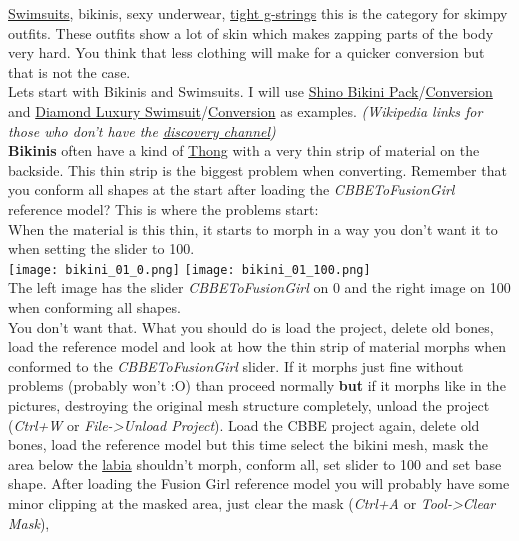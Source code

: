 \href{https://www.youtube.com/watch?v=-JuFE8AffBc&t=5s}{Swimsuits}, bikinis, sexy underwear, \href{https://www.youtube.com/watch?v=2aXTR27guQg&t=2m12s}{tight g-strings}
this is the category for skimpy outfits. These outfits show a lot of skin which makes zapping parts of the body very hard. You think 
that less clothing will make for a quicker conversion but that is not the case.\\
Lets start with Bikinis and Swimsuits. I will use 
\href{https://www.nexusmods.com/fallout4/mods/31788}{Shino Bikini Pack}/\href{https://www.nexusmods.com/fallout4/mods/39914}{Conversion} and
\href{https://www.nexusmods.com/fallout4/mods/24329}{Diamond Luxury Swimsuit}/\href{https://www.nexusmods.com/fallout4/mods/39754}{Conversion}
as examples. \textit{(Wikipedia links for those who don't have the \href{https://www.youtube.com/watch?v=l7KEuKKuuas&t=1m1s}{discovery channel})}\\
\textbf{Bikinis} often have a kind of \href{https://en.wikipedia.org/wiki/Thong_(clothing)}{Thong} with a very thin strip of material on the backside.
This thin strip is the biggest problem when converting. Remember that you conform all shapes at the start after loading the 
\textit{CBBEToFusionGirl} reference model? This is where the problems start:\\
When the material is this thin, it starts to morph in a way you don't want it to when setting the slider to 100.\\
\texttt{[image: bikini\_01\_0.png]}
\texttt{[image: bikini\_01\_100.png]}\\
The left image has the slider \textit{CBBEToFusionGirl} on 0 and the right image on 100 when conforming all shapes.\\
You don't want that. What you should do is load the project, delete old bones, load the reference model and look at how the thin strip 
of material morphs when conformed to the \textit{CBBEToFusionGirl} slider. If it morphs just fine without problems (probably won't :O) 
than proceed normally \textbf{but} if it morphs like in the pictures, destroying the original mesh structure completely, unload the project 
(\textit{Ctrl+W} or \textit{File->Unload Project}). Load the CBBE project again, delete old bones, load the reference model but this time select the bikini mesh,
mask the area below the \href{https://en.wikipedia.org/wiki/Labia}{labia} shouldn't morph, conform all, set slider to 100 and set base shape.
After loading the Fusion Girl reference model you will probably have some minor clipping at the masked area, just clear the mask (\textit{Ctrl+A} or \textit{Tool->Clear Mask}),
